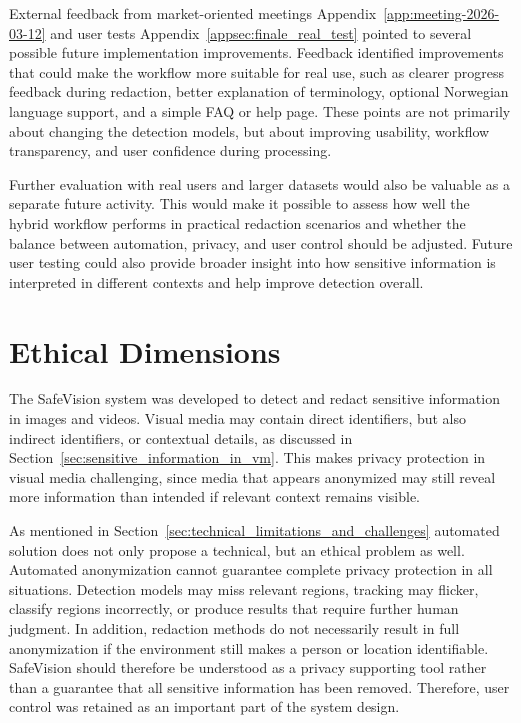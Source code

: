 External feedback from market-oriented meetings Appendix~\ref{app:meeting-2026-03-12} and user tests Appendix~\ref{appsec:finale_real_test} pointed to several possible future implementation improvements. Feedback identified improvements that could make the workflow more suitable for real use, such as clearer progress feedback during redaction, better explanation of terminology, optional Norwegian language support, and a simple FAQ or help page. These points are not primarily about changing the detection models, but about improving usability, workflow transparency, and user confidence during processing.

Further evaluation with real users and larger datasets would also be valuable as a separate future activity. This would make it possible to assess how well the hybrid workflow performs in practical redaction scenarios and whether the balance between automation, privacy, and user control should be adjusted. Future user testing could also provide broader insight into how sensitive information is interpreted in different contexts and help improve detection overall. 


\section{Ethical Dimensions}

The \gls{SafeVision} system was developed to detect and redact sensitive information in images and videos. Visual media may contain direct identifiers, but also indirect identifiers, or contextual details, as discussed in Section~\ref{sec:sensitive_information_in_vm}. This makes privacy protection in visual media challenging, since media that appears anonymized may still reveal more information than intended if relevant context remains visible.

As mentioned in Section~\ref{sec:technical_limitations_and_challenges} automated solution does not only propose a technical, but an ethical problem as well. Automated \gls{anonymization} cannot guarantee complete privacy protection in all situations. Detection models may miss relevant regions, tracking may flicker, classify regions incorrectly, or produce results that require further human judgment. In addition, redaction methods do not necessarily result in full \gls{anonymization} if the environment still makes a person or location identifiable. \gls{SafeVision} should therefore be understood as a privacy supporting tool rather than a guarantee that all sensitive information has been removed. Therefore, user control was retained as an important part of the system design. 

